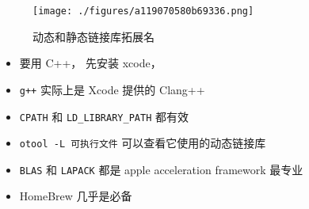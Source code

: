 
\begin{issues}
\issueDraft
\end{issues}

\begin{figure}[ht]
\centering
\texttt{[image: ./figures/a119070580b69336.png]}
\caption{动态和静态链接库拓展名} \label{fig_MacDev_1}
\end{figure}

\begin{itemize}
\item 要用 C++， 先安装 xcode， \item \verb`g++` 实际上是 Xcode 提供的 Clang++
\item \verb`CPATH` 和 \verb`LD_LIBRARY_PATH` 都有效
\item \verb`otool -L 可执行文件` 可以查看它使用的动态链接库
\item \verb`BLAS` 和 \verb`LAPACK` 都是 apple acceleration framework 最专业
\item HomeBrew 几乎是必备
\end{itemize}

